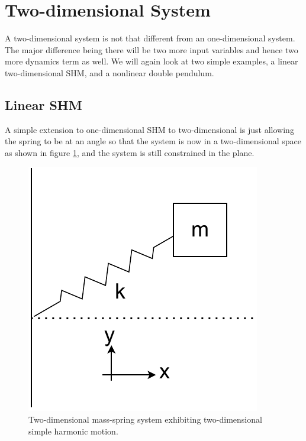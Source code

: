 \documentclass{statsmsc}
\begin{document}
\section{Two-dimensional System}
A two-dimensional system is not that different from an one-dimensional system. The major difference being there will be two more input variables and hence two more dynamics term as well. 
We will again look at two simple examples, a linear two-dimensional SHM, and a nonlinear double pendulum.

\subsection{Linear SHM}
A simple extension to one-dimensional SHM to two-dimensional is just allowing the spring to be at an angle so that the system is now in a two-dimensional space as shown in figure \ref{fig:shm_2d_diagram}, and the system is still constrained in the plane.

\begin{figure}[H]
        \centering
        \includegraphics[width=0.4\linewidth]{../figures/2dshm.pdf}
        \caption{Two-dimensional mass-spring system exhibiting two-dimensional simple harmonic motion.}
        \label{fig:shm_2d_diagram}
\end{figure}
\end{document}
